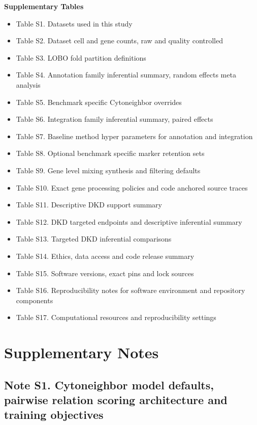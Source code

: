 \documentclass[11pt]{article}
\begin{document}
\noindent\textbf{Supplementary Tables}
\begin{itemize}
    \item Table S1. Datasets used in this study
    \item Table S2. Dataset cell and gene counts, raw and quality controlled
    \item Table S3. LOBO fold partition definitions
    \item Table S4. Annotation family inferential summary, random effects meta analysis
    \item Table S5. Benchmark specific Cytoneighbor overrides
    \item Table S6. Integration family inferential summary, paired effects
    \item Table S7. Baseline method hyper parameters for annotation and integration
    \item Table S8. Optional benchmark specific marker retention sets
    \item Table S9. Gene level mixing synthesis and filtering defaults
    \item Table S10. Exact gene processing policies and code anchored source traces
    \item Table S11. Descriptive DKD support summary
    \item Table S12. DKD targeted endpoints and descriptive inferential summary
    \item Table S13. Targeted DKD inferential comparisons
    \item Table S14. Ethics, data access and code release summary
    \item Table S15. Software versions, exact pins and lock sources
    \item Table S16. Reproducibility notes for software environment and repository components
    \item Table S17. Computational resources and reproducibility settings
\end{itemize}

\clearpage

\section*{Supplementary Notes}

\subsection*{Note S1. Cytoneighbor model defaults, pairwise relation scoring architecture and training objectives}
\end{document}
